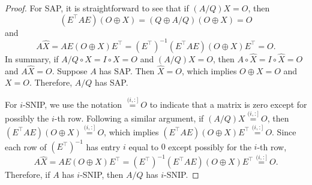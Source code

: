 \documentclass[10pt,a4paper]{amsart}
\newcommand{\trans}{^\top}
\begin{document}
\begin{proof}
For SAP, it is straightforward to see that if $(A/Q)X = O$, then 
\[
    (E\trans AE)(O\oplus X) = (Q\oplus A/Q)(O\oplus X) = O
\]
and
\[
    A\widehat{X} = AE(O\oplus X)E\trans = (E\trans)^{-1}(E\trans AE)(O\oplus X)E\trans = O.
\]
In summary, if $A/Q\circ X = I\circ X = O$ and $(A/Q)X = O$, then $A\circ\widehat{X} = I\circ\widehat{X} = O$ and $A\widehat{X} = O$.  Suppose $A$ has SAP.  Then $\widehat{X} = O$, which implies $O\oplus X = O$ and $X = O$.  Therefore, $A/Q$ has SAP.  

For $i$-SNIP, we use the notation $\overset{(i,:]}{=} O$ to indicate that a matrix is zero except for possibly the $i$-th row.  Following a similar argument, if $(A/Q) X \overset{(i,:]}{=} O$, then $(E\trans AE)(O\oplus X) \overset{(i,:]}{=} O$, which implies $(E\trans AE)(O\oplus X)E\trans \overset{(i,:]}{=} O$.  Since each row of $(E\trans)^{-1}$ has entry $i$ equal to $0$ except possibly for the $i$-th row,
\[
    A\widehat{X} = AE(O\oplus X)E\trans = (E\trans)^{-1}(E\trans AE)(O\oplus X)E\trans \overset{(i,:]}{=} O.
\]
Therefore, if $A$ has $i$-SNIP, then $A/Q$ has $i$-SNIP.  
\end{proof}
\end{document}
